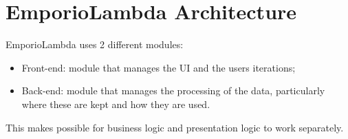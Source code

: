 \section{EmporioLambda Architecture}
EmporioLambda uses 2 different modules:
\begin{itemize}
\item Front-end: module that manages the UI and the users iterations;
\item Back-end: module that manages the processing of the data, particularly where these are kept and how they are used.
\end{itemize}
This makes possible for business logic and presentation logic to work separately.


\newpage

\newpage

\newpage

\newpage

\newpage